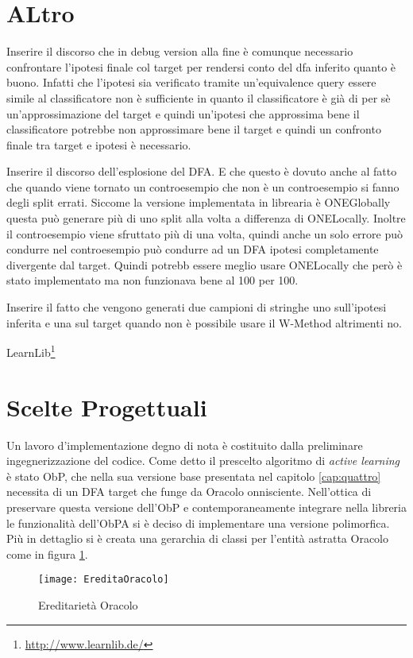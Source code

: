 \section{ALtro}
Inserire il discorso che in debug version alla fine è comunque necessario confrontare l'ipotesi finale col target per rendersi conto del dfa inferito quanto è buono. Infatti che l'ipotesi sia verificato tramite un'equivalence query essere simile al classificatore non è sufficiente in quanto il classificatore è già di per sè un'approssimazione del target e quindi un'ipotesi che approssima bene il classificatore potrebbe non approssimare bene il target e quindi un confronto finale tra target e ipotesi è necessario. 

Inserire il discorso dell'esplosione del DFA. E che questo è dovuto anche al fatto che quando viene tornato un controesempio che non è un controesempio si fanno degli split errati. Siccome la versione implementata in librearia è ONEGlobally questa può generare più di uno split alla volta a differenza di ONELocally. Inoltre il controesempio viene sfruttato più di una volta, quindi anche un solo errore può condurre nel controesempio può condurre ad un DFA ipotesi completamente divergente dal target. Quindi potrebb essere meglio usare ONELocally che però è stato implementato ma non funzionava bene al 100 per 100.

Inserire il fatto che vengono generati due campioni di stringhe uno sull'ipotesi inferita e una sul target quando non è possibile usare il W-Method altrimenti no. 

LearnLib\footnote{\href{http://www.learnlib.de/}{http://www.learnlib.de/}}




\section{Scelte Progettuali}
Un lavoro d'implementazione degno di nota è costituito dalla preliminare ingegnerizzazione del codice. Come detto il prescelto algoritmo di \textit{active learning} è stato \ac{ObP}, che nella sua versione base presentata nel capitolo \ref{cap:quattro} necessita di un \ac{DFA} target che funge da Oracolo onnisciente. Nell'ottica di preservare questa versione dell'\ac{ObP} e contemporaneamente integrare nella libreria le funzionalità dell'\ac{ObPA} si è deciso di implementare una versione polimorfica. Più in dettaglio si è creata una gerarchia di classi per l'entità astratta Oracolo come in figura \ref{fig:eor}.
\begin{figure}[htp]
	\centering
	\texttt{[image: EreditaOracolo]}
	\caption[Ereditarietà Oracolo]{Ereditarietà Oracolo}
   \label{fig:eor}
\end{figure}

